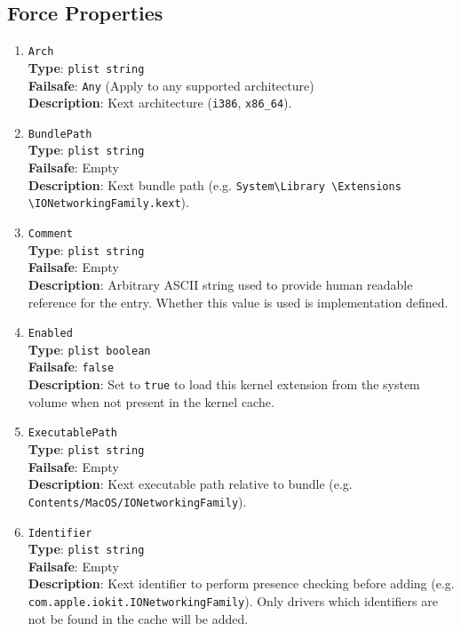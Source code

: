 \documentclass[]{article}
\makeatletter
\renewcommand{\label}[1]{%
\zref@wrapper@immediate{\oldlabel{#1}}}  %
\makeatother
\begin{document}
\subsection{Force Properties}\label{kernelpropsforce}

\begin{enumerate}

\item
  \texttt{Arch}\\
  \textbf{Type}: \texttt{plist\ string}\\
  \textbf{Failsafe}: \texttt{Any} (Apply to any supported architecture)\\
  \textbf{Description}: Kext architecture (\texttt{i386}, \texttt{x86\_64}).

\item
  \texttt{BundlePath}\\
  \textbf{Type}: \texttt{plist\ string}\\
  \textbf{Failsafe}: Empty\\
  \textbf{Description}: Kext bundle path (e.g.
  \texttt{System\textbackslash Library \textbackslash Extensions \textbackslash IONetworkingFamily.kext}).

\item
  \texttt{Comment}\\
  \textbf{Type}: \texttt{plist\ string}\\
  \textbf{Failsafe}: Empty\\
  \textbf{Description}: Arbitrary ASCII string used to provide human readable
  reference for the entry. Whether this value is used is implementation defined.

\item
  \texttt{Enabled}\\
  \textbf{Type}: \texttt{plist\ boolean}\\
  \textbf{Failsafe}: \texttt{false}\\
  \textbf{Description}: Set to \texttt{true} to load this kernel extension from the
  system volume when not present in the kernel cache.

\item
  \texttt{ExecutablePath}\\
  \textbf{Type}: \texttt{plist\ string}\\
  \textbf{Failsafe}: Empty\\
  \textbf{Description}: Kext executable path relative to bundle
  (e.g. \texttt{Contents/MacOS/IONetworkingFamily}).

\item
  \texttt{Identifier}\\
  \textbf{Type}: \texttt{plist\ string}\\
  \textbf{Failsafe}: Empty\\
  \textbf{Description}: Kext identifier to perform presence checking
  before adding (e.g. \texttt{com.apple.iokit.IONetworkingFamily}).
  Only drivers which identifiers are not be found in the cache will be added.


\end{enumerate}
\end{document}
